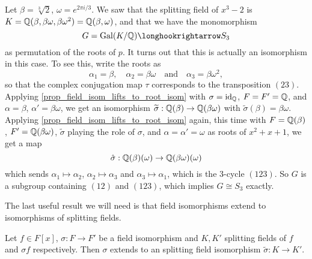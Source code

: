 \begin{example}
\label{exmp_gal_grp_of_cbrt_2}
    Let $\beta = \sqrt[3]{2}$, $\omega = e^{2\pi i/3}$. We saw that the splitting field of $x^3 - 2$ is $K = \mathbb{{Q}}(\beta, \beta \omega, \beta \omega^2) = \mathbb{{Q}}(\beta, \omega)$, and that we have the monomorphism
    \[
        G = \gal(K/\bb{Q}) \inclusion S_3
    \]
    as permutation of the roots of $p$. It turns out that this is actually an isomorphism in this case. To see this, write the roots as
    \[
        \alpha_1 = \beta,
        \quad
        \alpha_2 = \beta \omega
        \quad \text{and} \quad
        \alpha_3 = \beta \omega^2,
    \]
    so that the complex conjugation map $\tau$ corresponds to the transposition $(23)$. Applying \cref{prop_field_isom_lifts_to_root_isom} with $\sigma = \operatorname{id}_{\mathbb{{Q}}}$, $F = F' = \mathbb{{Q}}$, and $\alpha = \beta$, $\alpha' = \beta \omega$, we get an isomorphism $\widetilde{\sigma}: \mathbb{{Q}}(\beta) \to \mathbb{{Q}}(\beta \omega)$ with $\widetilde{\sigma}(\beta) = \beta \omega$. Applying \cref{prop_field_isom_lifts_to_root_isom} again, this time with $F = \mathbb{{Q}}(\beta)$, $F' = \mathbb{{Q}}(\beta \omega)$, $\widetilde{\sigma}$ playing the role of $\sigma$, and $\alpha = \alpha' = \omega$ as roots of $x^2 + x + 1$, we get a map
    \[
        \hat{\sigma} : \mathbb{{Q}}(\beta)(\omega) \to \mathbb{{Q}}(\beta \omega)(\omega)
    \]
    which sends $\alpha_1 \mapsto \alpha_2$, $\alpha_2 \mapsto \alpha_3$ and $\alpha_3 \mapsto \alpha_1$, which is the 3-cycle $(123)$. So $G$ is a subgroup containing $(12)$ and $(123)$, which implies $G \cong S_3$ exactly.
\end{example}

The last useful result we will need is that field isomorphisms extend to isomorphisms of splitting fields.

\begin{proposition}
\label{prop_field_isom_ext_to_spl_field_isom}
    Let $f \in F[x]$, $\sigma: F \to F'$ be a field isomorphism and $K, K'$ splitting fields of $f$ and $\sigma f$ respectively. Then $\sigma$ extends to an splitting field isomorphism $\widetilde{\sigma}: K \to K'$.
\end{proposition}

